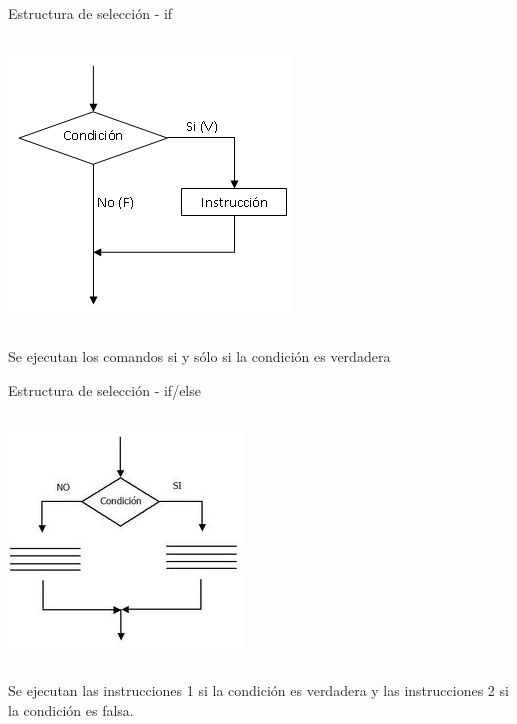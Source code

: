 \documentclass{bredelebeamer}
\begin{document}
\begin{frame}{Estructura de selección - if}
\begin{columns}
\begin{column}{0.5\textwidth}
\begin{center}
\includegraphics[scale=0.5]{images/pantalla5.png}
\end{center}
\end{column}
\begin{column}{0.5\textwidth}

\end{column}
\end{columns}
\begin{center}
Se ejecutan los comandos si y sólo si la condición es verdadera
\end{center}
\end{frame}

\begin{frame}{Estructura de selección - if/else}
\begin{columns}
\begin{column}{0.5\textwidth}
\begin{center}
\includegraphics[scale=0.5]{images/pantalla4.png}
\end{center}
\end{column}
\begin{column}{0.5\textwidth}

\end{column}
\end{columns}
\begin{center}
Se ejecutan las instrucciones 1 si la condición es verdadera y las instrucciones 2 si la condición es falsa. 
\end{center}
\end{frame}
\end{document}
